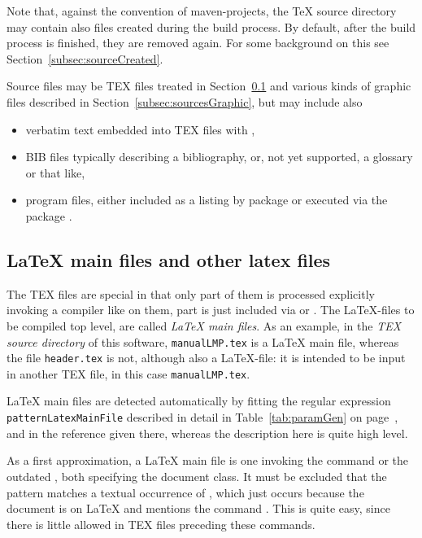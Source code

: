 Note that, against the convention of maven-projects, 
the \TeX{} source directory may contain also files created during the build process. 
By default, after the build process is finished, they are removed again. 
For some background on this see Section~\ref{subsec:sourceCreated}. 

Source files may be TEX files treated in Section~\ref{subsec:sourcesLatex} 
and various kinds of graphic files described in Section~\ref{subsec:sourcesGraphic}, 
but may include also 
%
\begin{itemize}
\item 
verbatim text embedded into TEX files with , 
\item 
BIB files typically describing a bibliography,  or, %
not yet supported, a glossary or that like, %
\item 
program files, either included as a listing by package  
or executed via the package . %
\end{itemize}


\subsection{\texorpdfstring{\LaTeX{} main files}{LaTeX main files} and other latex files}%
\label{subsec:sourcesLatex}

The TEX files are special in that only part of them is processed explicitly 
invoking a compiler like \lualatex{} on them, 
part is just included via  or . 
The \LaTeX-files to be compiled top level, 
are called \emph{\LaTeX{} main files}. 
As an example, 
in the \emph{TEX source directory} of this software, 
\texttt{manualLMP.tex} is a \LaTeX{} main file, 
whereas the file \texttt{header.tex} is not, although also a \LaTeX-file: 
it is intended to be input in another TEX file, in this case \texttt{manualLMP.tex}. 


\LaTeX{} main files are detected automatically 
by fitting the regular expression \texttt{patternLatexMainFile} 
described in detail in Table~\ref{tab:paramGen} on page~\pageref{tab:paramGen}, 
and in the reference given there, 
whereas the description here is quite high level. 

As a first approximation, a \LaTeX{} main file is one invoking 
the command  
or the outdated , both specifying the document class. 
It must be excluded that the pattern matches a textual occurrence of , 
which just occurs because the document is on \LaTeX{} 
and mentions the command . 
This is quite easy, since there is little allowed in TEX files preceding these commands. 

